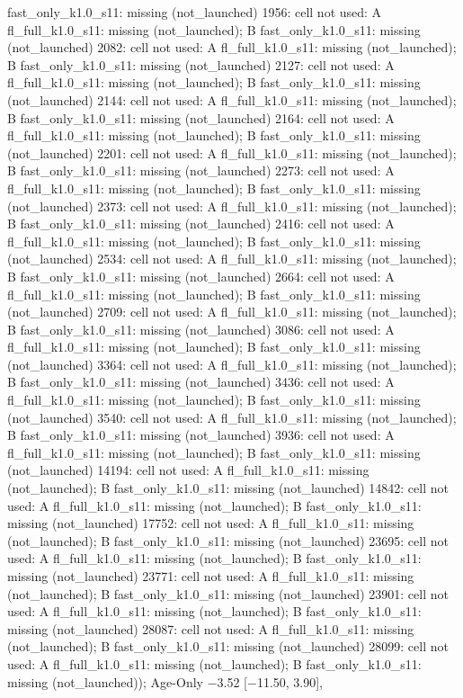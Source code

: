 \begin{table}[t]
{fast\_only\_k1.0\_s11: missing (not\_launched) \textbar{} 1956: cell not used: A fl\_full\_k1.0\_s11: missing (not\_launched); B fast\_only\_k1.0\_s11: missing (not\_launched) \textbar{} 2082: cell not used: A fl\_full\_k1.0\_s11: missing (not\_launched); B fast\_only\_k1.0\_s11: missing (not\_launched) \textbar{} 2127: cell not used: A fl\_full\_k1.0\_s11: missing (not\_launched); B fast\_only\_k1.0\_s11: missing (not\_launched) \textbar{} 2144: cell not used: A fl\_full\_k1.0\_s11: missing (not\_launched); B fast\_only\_k1.0\_s11: missing (not\_launched) \textbar{} 2164: cell not used: A fl\_full\_k1.0\_s11: missing (not\_launched); B fast\_only\_k1.0\_s11: missing (not\_launched) \textbar{} 2201: cell not used: A fl\_full\_k1.0\_s11: missing (not\_launched); B fast\_only\_k1.0\_s11: missing (not\_launched) \textbar{} 2273: cell not used: A fl\_full\_k1.0\_s11: missing (not\_launched); B fast\_only\_k1.0\_s11: missing (not\_launched) \textbar{} 2373: cell not used: A fl\_full\_k1.0\_s11: missing (not\_launched); B fast\_only\_k1.0\_s11: missing (not\_launched) \textbar{} 2416: cell not used: A fl\_full\_k1.0\_s11: missing (not\_launched); B fast\_only\_k1.0\_s11: missing (not\_launched) \textbar{} 2534: cell not used: A fl\_full\_k1.0\_s11: missing (not\_launched); B fast\_only\_k1.0\_s11: missing (not\_launched) \textbar{} 2664: cell not used: A fl\_full\_k1.0\_s11: missing (not\_launched); B fast\_only\_k1.0\_s11: missing (not\_launched) \textbar{} 2709: cell not used: A fl\_full\_k1.0\_s11: missing (not\_launched); B fast\_only\_k1.0\_s11: missing (not\_launched) \textbar{} 3086: cell not used: A fl\_full\_k1.0\_s11: missing (not\_launched); B fast\_only\_k1.0\_s11: missing (not\_launched) \textbar{} 3364: cell not used: A fl\_full\_k1.0\_s11: missing (not\_launched); B fast\_only\_k1.0\_s11: missing (not\_launched) \textbar{} 3436: cell not used: A fl\_full\_k1.0\_s11: missing (not\_launched); B fast\_only\_k1.0\_s11: missing (not\_launched) \textbar{} 3540: cell not used: A fl\_full\_k1.0\_s11: missing (not\_launched); B fast\_only\_k1.0\_s11: missing (not\_launched) \textbar{} 3936: cell not used: A fl\_full\_k1.0\_s11: missing (not\_launched); B fast\_only\_k1.0\_s11: missing (not\_launched) \textbar{} 14194: cell not used: A fl\_full\_k1.0\_s11: missing (not\_launched); B fast\_only\_k1.0\_s11: missing (not\_launched) \textbar{} 14842: cell not used: A fl\_full\_k1.0\_s11: missing (not\_launched); B fast\_only\_k1.0\_s11: missing (not\_launched) \textbar{} 17752: cell not used: A fl\_full\_k1.0\_s11: missing (not\_launched); B fast\_only\_k1.0\_s11: missing (not\_launched) \textbar{} 23695: cell not used: A fl\_full\_k1.0\_s11: missing (not\_launched); B fast\_only\_k1.0\_s11: missing (not\_launched) \textbar{} 23771: cell not used: A fl\_full\_k1.0\_s11: missing (not\_launched); B fast\_only\_k1.0\_s11: missing (not\_launched) \textbar{} 23901: cell not used: A fl\_full\_k1.0\_s11: missing (not\_launched); B fast\_only\_k1.0\_s11: missing (not\_launched) \textbar{} 28087: cell not used: A fl\_full\_k1.0\_s11: missing (not\_launched); B fast\_only\_k1.0\_s11: missing (not\_launched) \textbar{} 28099: cell not used: A fl\_full\_k1.0\_s11: missing (not\_launched); B fast\_only\_k1.0\_s11: missing (not\_launched)); Age-Only $-$3.52 [$-$11.50, 3.90], }
\end{table}
